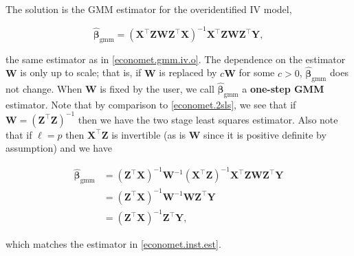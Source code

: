 The solution is the GMM estimator for the overidentified IV model,

\[
\hat{\boldsymbol{\beta}}_{\text{gmm}} =\left(\boldsymbol{X} ^\top \boldsymbol{Z} \boldsymbol{W}  \boldsymbol{Z}^\top \boldsymbol{X}\right)^{-1}  \boldsymbol{X} ^\top \boldsymbol{Z} \boldsymbol{W} \boldsymbol{Z}^\top \boldsymbol{Y} ,
\]

the same estimator as in \eqref{economet.gmm.iv.o}. The dependence on the estimator \(\boldsymbol{W}\) is only up to scale; that is, if \(\boldsymbol{W}\) is replaced by \(c \boldsymbol{W}\) for some \(c > 0\), \(\hat{\boldsymbol{\beta}}_{\text{gmm}}\) does not change. When \(\boldsymbol{W}\) is fixed by the user, we call \(\hat{\boldsymbol{\beta}}_{\text{gmm}}\) a \textbf{one-step GMM} estimator. Note that by comparison to \eqref{economet.2sls}, we see that if \(\boldsymbol{W} = \left(  \boldsymbol{Z}^\top  \boldsymbol{Z}\right)^{-1} \) then we have the two stage least squares estimator. Also note that if \(\ell = p\) then \(\boldsymbol{X}^\top \boldsymbol{Z}\) is invertible (as is \(\boldsymbol{W}\) since it is positive definite by assumption) and we have

\begin{align*}
\hat{\boldsymbol{\beta}}_{\text{gmm}} & =  \left( \boldsymbol{Z}^\top \boldsymbol{X}\right)^{-1}\boldsymbol{W}^{-1}  \left(\boldsymbol{X} ^\top \boldsymbol{Z} \right)^{-1} \boldsymbol{X} ^\top \boldsymbol{Z} \boldsymbol{W} \boldsymbol{Z}^\top \boldsymbol{Y}
\\ & =  \left( \boldsymbol{Z}^\top \boldsymbol{X}\right)^{-1}\boldsymbol{W}^{-1}   \boldsymbol{W} \boldsymbol{Z}^\top \boldsymbol{Y} 
\\ & =  \left( \boldsymbol{Z}^\top \boldsymbol{X}\right)^{-1}\boldsymbol{Z}^\top \boldsymbol{Y}   ,
\end{align*}

which matches the estimator in \eqref{economet.inst.est}.

%
%
%